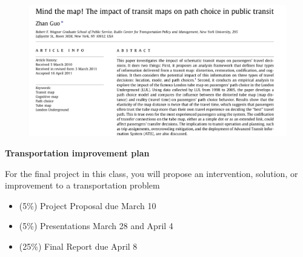 \documentclass[aspectratio=169]{beamer}
\begin{document}
\begin{frame}
	
	\begin{figure}
		\centering
		\includegraphics[width=0.88\linewidth]{images/mind-the-map.png}
	\end{figure}
	
\end{frame}







\begin{frame}
	
	\textbf{Transportation improvement plan}
	
	\vspace{2mm}
	
	For the final project in this class, you will propose an intervention, solution, or improvement to a transportation problem
	
	\vspace{2mm}
	
	\begin{itemize}
		\item (5\%) Project Proposal due March 10
		\item (5\%) Presentations March 28 and April 4
		\item (25\%) Final Report due April 8
	\end{itemize}
	
\end{frame}
\end{document}
